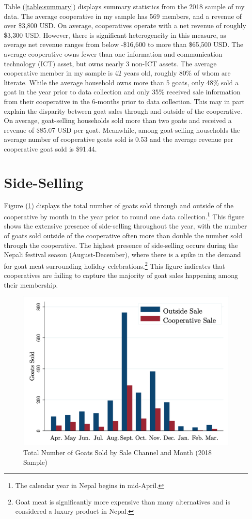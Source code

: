 \documentclass[11pt]{article}
\begin{document}
Table (\ref{table:summary}) displays summary statistics from the 2018 sample of my data. The average cooperative in my sample has 569 members, and a revenue of over \$3,800 USD. On average, cooperatives operate with a net revenue of roughly \$3,300 USD. However, there is significant heterogeneity in this measure, as average net revenue ranges from below -\$16,600 to more than \$65,500 USD. The average cooperative owns fewer than one information and communication technology (ICT) asset, but owns nearly 3 non-ICT assets. The average cooperative member in my sample is 42 years old, roughly 80\% of whom are literate. While the average household owns more than 5 goats, only 48\% sold a goat in the year prior to data collection and only 35\% received sale information from their cooperative in the 6-months prior to data collection. This may in part explain the disparity between goat sales through and outside of the cooperative. On average, goat-selling households sold more than two goats and received a revenue of \$85.07 USD per goat. Meanwhile, among goat-selling households the average number of cooperative goats sold is 0.53 and the average revenue per cooperative goat sold is \$91.44.

\section{Side-Selling}

Figure (\ref{figure:E2_month}) displays the total number of goats sold through and outside of the cooperative by month in the year prior to round one data collection.\footnote{The calendar year in Nepal begins in mid-April.} This figure shows the extensive presence of side-selling throughout the year, with the number of goats sold outside of the cooperative often more than double the number sold through the cooperative. The highest presence of side-selling occurs during the Nepali festival season (August-December), where there is a spike in the demand for goat meat surrounding holiday celebrations.\footnote{Goat meat is significantly more expensive than many alternatives and is considered a luxury product in Nepal.} This figure indicates that cooperatives are failing to capture the majority of goat sales happening among their membership. 

\vspace{.5cm}
\begin{figure}[H]
    \caption{Total Number of Goats Sold by Sale Channel and Month (2018 Sample)}
    \label{figure:E2_month}
    \noindent \centering \includegraphics[width=.55\textwidth,trim=4 4 4 4,clip]{E2_SaleMonth.png}
\end{figure}
\end{document}

